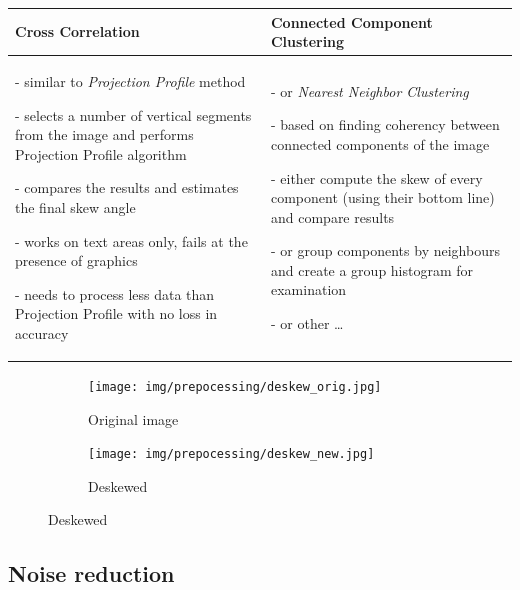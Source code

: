 
\begin{longtable}{p{19em}p{19em}}
\textbf{Cross Correlation} & \textbf{Connected Component Clustering}\\
\midrule

- similar to \emph{Projection Profile} method

- selects a number of vertical segments from the image and performs Projection Profile algorithm

- compares the results and estimates the final skew angle

- works on text areas only, fails at the presence of graphics

- needs to process less data than Projection Profile with no loss in accuracy
&

- or \emph{Nearest Neighbor Clustering} \citep{skewClustering}

- based on finding coherency between connected components of the image

- either compute the skew of every component (using their bottom line) and compare results

- or group components by neighbours and create a group histogram for examination

- or other \ldots

\end{longtable}



\begin{figure}[H]
\centering
\hspace*{\fill} %
\begin{subfigure}{0.31\textwidth}
\texttt{[image: img/prepocessing/deskew\_orig.jpg]}
\caption{Original image} \label{fig:1a}
\end{subfigure}
\hspace*{\fill} %
\begin{subfigure}{0.31\textwidth}
\texttt{[image: img/prepocessing/deskew\_new.jpg]}
\caption{Deskewed} \label{fig:1b}
\end{subfigure}
\end{figure}

\subsection{Noise reduction}

